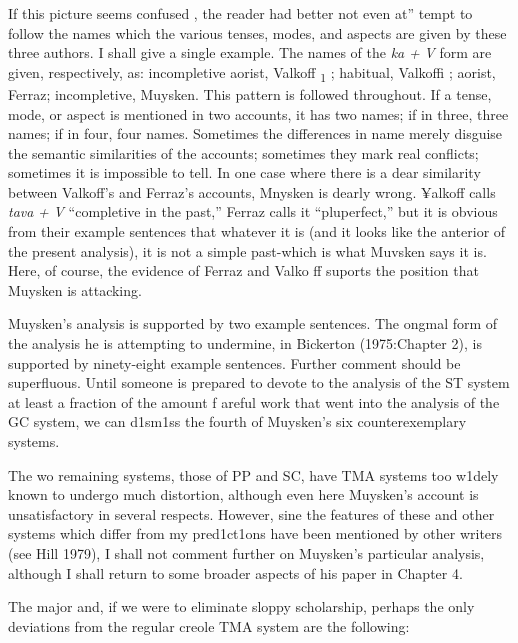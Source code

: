 If this picture seems confused , the reader had better not even at'' tempt to follow the names which the various tenses, modes, and aspects are given by these three authors. I shall give a single example. The names of the \textit{ka} \textit{+} \textit{V} form are given, respectively, as: incompletive aorist, Valkoff \textsubscript{1}\textsubscript{ }; habitual, Valkoffi ; aorist, Ferraz; incompletive, Muysken. This pattern is followed throughout. If a tense, mode, or aspect is mentioned in two accounts, it has two names; if in three, three names; if in four, four names. Sometimes the differences in name merely disguise the semantic similarities of the accounts; sometimes they mark real conflicts; sometimes it is impossible to tell. In one case where there is a dear similarity between Valkoff's and Ferraz's accounts, Mnysken is dearly wrong. ¥alkoff calls \textit{tava} \textit{+} \textit{V} ``completive
in the past,'' Ferraz calls it ``pluperfect,'' but it is obvious from their example sentences that whatever it is (and it looks like the anterior of the present analysis), it is not a simple past-which is what Muvsken says it is. Here, of course, the evidence of Ferraz and Valko ff suports the position that Muysken is attacking.

Muysken's analysis is supported by two example sentences. The ongmal form of the analysis he is attempting to undermine, in Bicker\-ton (1975:Chapter 2), is supported by ninety-eight example sentences. Further comment should be superfluous. Until someone is prepared to devote to the analysis of the ST system at least a fraction of the amount f areful work that went into the analysis of the GC system, we can d1sm1ss the fourth of Muysken's six counterexemplary systems.

The wo remaining systems, those of PP and SC, have TMA sys\-tems too w1dely known to undergo much distortion, although even here Muysken's account is unsatisfactory in several respects. However, sine the features of these and other systems which differ from my pred1ct1ons have been mentioned by other writers (see Hill 1979), I shall not comment further on Muysken's particular analysis, although I shall return to some broader aspects of his paper in Chapter 4.

The major and, if we were to eliminate sloppy scholarship,
perhaps the only deviations from the regular creole TMA system are the following:



